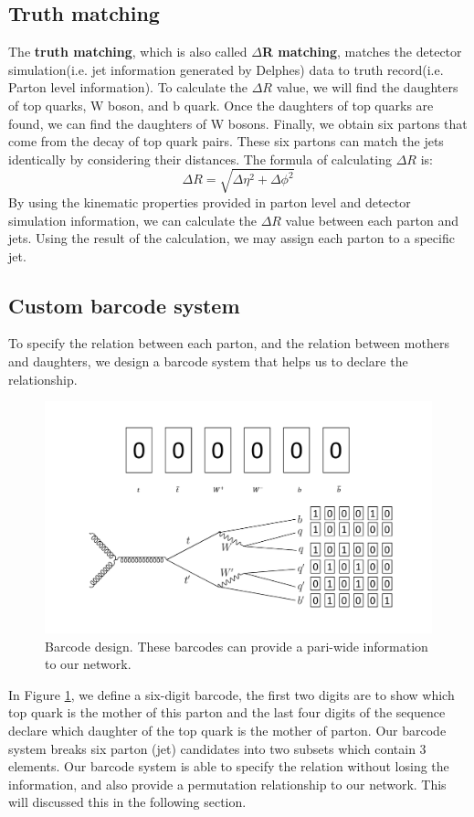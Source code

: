 \subsection{Truth matching}\label{subsec:Truth matching}
The \textbf{truth matching}, which is also called \textbf{$\Delta$R matching},  matches the detector simulation(i.e. jet information generated by Delphes) data to truth record(i.e. Parton level information).  To calculate the $\Delta R$ value, we will find the daughters of top quarks, W boson, and b quark. Once the daughters of top quarks are found, we can find the daughters of W bosons. Finally, we obtain six partons that come from the decay of top quark pairs. These six partons can match the jets identically by considering their distances. The formula of calculating $\Delta R$ is:
\\
\begin{equation}
	\Delta R = \sqrt{\Delta\eta^{2} + \Delta\phi^{2}}
\end{equation}
By using the kinematic properties provided in parton level and detector simulation information, we can calculate the $\Delta R$ value between each parton and jets. Using the result of the calculation, we may assign each parton to a specific jet. 
\\
\subsection{Custom barcode system}\label{subsec:barcode}
To specify the relation between each parton, and the relation between mothers and daughters, we design a barcode system that helps us to declare the relationship.
\begin{figure}[H]
	\centering
	\includegraphics[width=1.1\linewidth]{Figures/barcode.pdf}
	\caption{Barcode design. These barcodes can provide a pari-wide information to our network.}
	\label{fig:barcode}
\end{figure}
\newpage
In Figure \ref{fig:barcode}, we define a six-digit barcode, the first two digits are to show which top quark is the mother of this parton and the last four digits of the sequence declare which daughter of the top quark is the mother of parton. Our barcode system breaks six parton (jet) candidates into two subsets which contain 3 elements. Our barcode system is able to specify the relation without losing the information, and also provide a permutation relationship to our network. This will discussed this in the following section.
